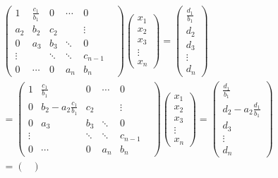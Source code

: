 \documentclass[12pt]{article}
\begin{document}
    \begin{align*}
      &\begin{pmatrix}
          1 & \frac{c_1}{b_1} & 0 & \cdots & 0 \\
        a_2 & b_2 & c_2 & & \vdots \\
        0 & a_3 & b_3 & \ddots & 0 & \\
        \vdots & & \ddots & \ddots & c_{n-1} \\ 
        0 & \cdots & 0 & a_n & b_n
      \end{pmatrix}
      \begin{pmatrix}
        x_1 \\ x_2 \\ x_3 \\ \vdots \\ x_n 
      \end{pmatrix}
      = 
      \begin{pmatrix}
          \frac{d_1}{b_1} \\ d_2 \\ d_3 \\ \vdots \\ d_n 
      \end{pmatrix} \\[10pt]
      &=\begin{pmatrix}
          1 & \frac{c_1}{b_1} & 0 & \cdots & 0 \\
          0 & b_2 - a_2\frac{c_1}{b_1} & c_2 & & \vdots \\
        0 & a_3 & b_3 & \ddots & 0 & \\
        \vdots & & \ddots & \ddots & c_{n-1} \\ 
        0 & \cdots & 0 & a_n & b_n
      \end{pmatrix}
      \begin{pmatrix}
        x_1 \\ x_2 \\ x_3 \\ \vdots \\ x_n 
      \end{pmatrix}
      = 
      \begin{pmatrix}
          \frac{d_1}{b_1} \\ d_2 - a_2\frac{d_1}{b_1} \\ d_3 \\ \vdots \\ d_n 
      \end{pmatrix} \\[10pt]
      &=\begin{pmatrix}

\end{pmatrix}
\end{align*}
\end{document}
